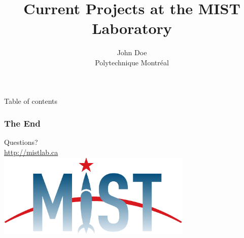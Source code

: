 \documentclass[aspectratio=1610]{beamer}
\begin{document}

\title[Current Projects]{Current Projects at the MIST Laboratory}
\subtitle{}
\author[J. DOE]{
		John Doe\\
		Polytechnique Montr\'eal\\ 
}


\begin{frame}[plain]
  \titlepage
\end{frame}


\begin{frame}{Table of contents}
  \tableofcontents
\end{frame}

\appendix
{}
\setcounter{finalframe}{\value{framenumber}}

\begin{frame}
\frametitle{The End}
\begin{center}
{\Huge Questions?}\\
\url{http://mistlab.ca}\\
\includegraphics[height=4cm]{images/mistlogo.pdf}
\end{center}
\end{frame}

%
%        
%        
%
\end{document}
